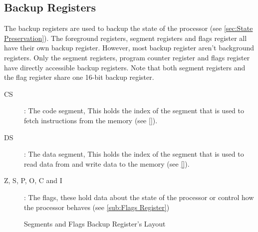 \documentclass[oneside, a4paper]{memoir}
\begin{document}
\subsection{Backup Registers}
The backup registers are used to backup the state of the processor (see \autoref{sec:State Preservation}). The foreground registers, segment registers and flags register all have their own backup register. However, most backup register aren't background registers. Only the segment registers, program counter register and flags register have directly accessible backup registers. Note that both segment registers and the flag register share one 16-bit backup register.
\begin{description}
\item[CS]: The code segment, This holds the index of the segment that is used to fetch instructions from the memory (see \autoref{}).
\item[DS]: The data segment, This holds the index of the segment that is used to read data from and write data to the memory (see \autoref{}).
\item[Z, S, P, O, C and I]: The flags, these hold data about the state of the processor or control how the processor behaves (see \autoref{sub:Flags Register})
\end{description}
\begin{figure}[h!]
\begin{center}
\caption{Segments and Flags Backup Register's Layout}
\end{center}
\end{figure}
\end{document}
